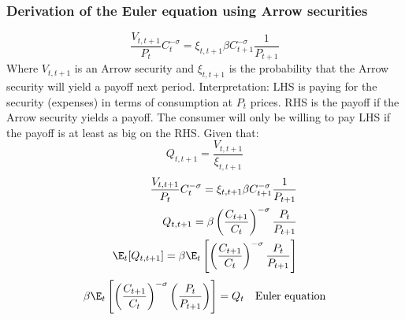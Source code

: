 \subsubsection*{Derivation of the Euler equation using Arrow securities}
\begin{equation}
    \frac{V_{t,t+1}}{P_t}C_{t}^{-\sigma} = \xi_{t,t+1} \beta C_{t+1}^{-\sigma} \frac{1}{P_{t+1}} \label{eq:introduces_arrow_securities}
\end{equation}
Where $V_{t,t+1}$ is an Arrow security and $\xi_{t,t+1}$ is the probability that the Arrow security will yield a payoff next period. Interpretation: LHS is paying for the security (expenses) in terms of consumption at $P_t$ prices. RHS is the payoff if the Arrow security yields a payoff. The consumer will only be willing to pay LHS if the payoff is at least as big on the RHS.
Given that:
\begin{equation}
    Q_{t,t+1} = \frac{V_{t,t+1}}{\xi_{t,t+1}}
\end{equation}
\begin{align}
    \frac{V_{t,t+1}}{P_t}C_{t}^{-\sigma} = \xi_{t,t+1} \beta C_{t+1}^{-\sigma} \frac{1}{P_{t+1}} \\
    Q_{t,t+1} = \beta \left(\frac{C_{t+1}}{C_{t}}\right)^{-\sigma} \frac{P_t}{P_{t+1}}           \\
    \E_t [Q_{t,t+1}] = \beta \E_t\left[\left(\frac{C_{t+1}}{C_{t}}\right)^{-\sigma} \frac{P_t}{P_{t+1}}\right]
\end{align}
\begin{align}
    \beta\E_t\left[\left(\frac{C_{t+1}}{C_{t}}\right)^{-\sigma} \left(\frac{P_{t}}{ P_{t+1}}\right)\right]             = Q_t &  & \text{Euler equation}
\end{align}
\newpage